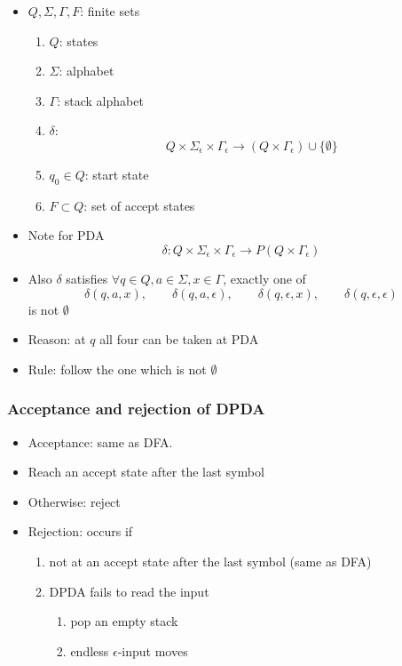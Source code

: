 \begin{frame}[allowframebreaks]
\begin{itemize}
\item [] $Q, \Sigma, \Gamma, F$: finite sets
\begin{enumerate}
\item $Q$: states
\item $\Sigma$: alphabet
\item $\Gamma$: stack alphabet
\item $\delta$: 
  \begin{equation*}
Q \times 
\Sigma_{\epsilon} \times \Gamma_{\epsilon}
\rightarrow (Q\times \Gamma_\epsilon)\cup \{\emptyset\} 
\end{equation*}
\item $q_0 \in Q$: start state
\item $F \subset Q$: set of accept states
\end{enumerate}
\item Note for PDA
  \begin{equation*}
\delta: Q \times 
\Sigma_{\epsilon} \times \Gamma_{\epsilon}
\rightarrow P(Q\times \Gamma_\epsilon)
\end{equation*}
\item Also $\delta$ satisfies $\forall q \in Q, a \in \Sigma, x \in
\Gamma$, exactly one of
\begin{equation*}
  \delta(q,a,x), \qquad \delta(q,a,\epsilon), \qquad
\delta(q, \epsilon, x), \qquad \delta(q, \epsilon, \epsilon)
\end{equation*}
is not $\emptyset$

\item Reason: at $q$ all four can be taken at PDA
\item Rule: follow the one which is not $\emptyset$
\end{itemize}\end{frame} \begin{frame}[allowframebreaks] \frametitle{Acceptance and rejection of DPDA}
  \begin{itemize}
\item Acceptance: same as DFA. 
\item [] Reach an accept state after the last symbol
\item [] Otherwise: reject

\item Rejection: occurs if
  \begin{enumerate}
  \item not at an accept state after the last symbol (same as DFA)
  \item DPDA fails to read the input
    \begin{enumerate}
    \item pop an empty stack
    \item endless $\epsilon$-input moves
    \end{enumerate}
  \end{enumerate}


\end{itemize}
\end{frame}
